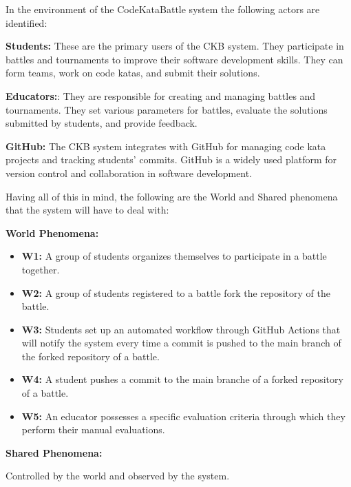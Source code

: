 \documentclass{article}
\begin{document}
In the environment of the CodeKataBattle system the following actors are identified:

\textbf{Students:} These are the primary users of the CKB system. They participate in battles and tournaments to improve their software development skills. They can form teams, work on code katas, and submit their solutions.

\textbf{Educators:}: They are responsible for creating and managing battles and tournaments. They set various parameters for battles, evaluate the solutions submitted by students, and provide feedback.

\textbf{GitHub:} The CKB system integrates with GitHub for managing code kata projects and tracking students' commits. GitHub is a widely used platform for version control and collaboration in software development.

Having all of this in mind, the following are the World and Shared phenomena that the system will have to deal with:

\textbf{World Phenomena:}

\begin{itemize}
    \item \textbf{W1:} A group of students organizes themselves to participate in a battle together.
    \item \textbf{W2:} A group of students registered to a battle fork the repository of the battle.
    \item \textbf{W3:} Students set up an automated workflow through GitHub Actions that will notify the system every time a commit is pushed to the main branch of the forked repository of a battle.
    \item \textbf{W4:} A student pushes a commit to the main branche of a forked repository of a battle.
    \item \textbf{W5:} An educator possesses a specific evaluation criteria through which they perform their manual evaluations.
\end{itemize}

\textbf{Shared Phenomena:}

Controlled by the world and observed by the system.
\end{document}
